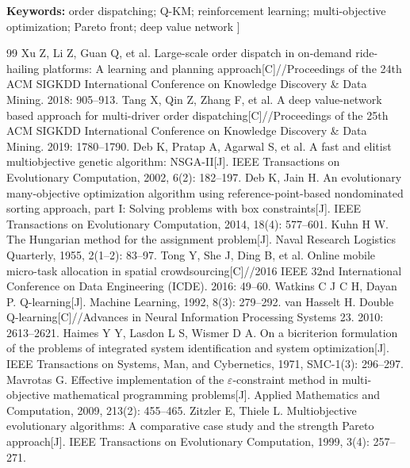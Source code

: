 \documentclass[twocolumn]{article}
\begin{document}
{\noindent \textbf{Keywords:} order dispatching; Q-KM; reinforcement learning; multi-objective optimization; Pareto front; deep value network}
\vspace{0.8em}
]





\begin{thebibliography}{99}
\small
\setlength{\itemsep}{0pt}
 Xu Z, Li Z, Guan Q, et al. Large-scale order dispatch in on-demand ride-hailing platforms: A learning and planning approach[C]//Proceedings of the 24th ACM SIGKDD International Conference on Knowledge Discovery \& Data Mining. 2018: 905--913.
 Tang X, Qin Z, Zhang F, et al. A deep value-network based approach for multi-driver order dispatching[C]//Proceedings of the 25th ACM SIGKDD International Conference on Knowledge Discovery \& Data Mining. 2019: 1780--1790.
 Deb K, Pratap A, Agarwal S, et al. A fast and elitist multiobjective genetic algorithm: NSGA-II[J]. IEEE Transactions on Evolutionary Computation, 2002, 6(2): 182--197.
 Deb K, Jain H. An evolutionary many-objective optimization algorithm using reference-point-based nondominated sorting approach, part I: Solving problems with box constraints[J]. IEEE Transactions on Evolutionary Computation, 2014, 18(4): 577--601.
 Kuhn H W. The Hungarian method for the assignment problem[J]. Naval Research Logistics Quarterly, 1955, 2(1--2): 83--97.
 Tong Y, She J, Ding B, et al. Online mobile micro-task allocation in spatial crowdsourcing[C]//2016 IEEE 32nd International Conference on Data Engineering (ICDE). 2016: 49--60.
 Watkins C J C H, Dayan P. Q-learning[J]. Machine Learning, 1992, 8(3): 279--292.
 van Hasselt H. Double Q-learning[C]//Advances in Neural Information Processing Systems 23. 2010: 2613--2621.
 Haimes Y Y, Lasdon L S, Wismer D A. On a bicriterion formulation of the problems of integrated system identification and system optimization[J]. IEEE Transactions on Systems, Man, and Cybernetics, 1971, SMC-1(3): 296--297.
 Mavrotas G. Effective implementation of the $\varepsilon$-constraint method in multi-objective mathematical programming problems[J]. Applied Mathematics and Computation, 2009, 213(2): 455--465.
 Zitzler E, Thiele L. Multiobjective evolutionary algorithms: A comparative case study and the strength Pareto approach[J]. IEEE Transactions on Evolutionary Computation, 1999, 3(4): 257--271.

\end{thebibliography}
\end{document}
